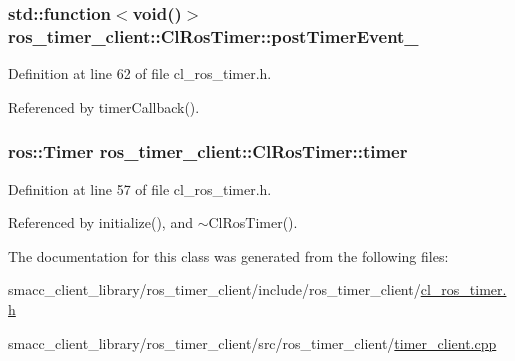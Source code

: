 \subsubsection[{\texorpdfstring{post\+Timer\+Event\+\_\+}{postTimerEvent_}}]{\setlength{\rightskip}{0pt plus 5cm}std\+::function$<$void()$>$ ros\+\_\+timer\+\_\+client\+::\+Cl\+Ros\+Timer\+::post\+Timer\+Event\+\_\+\hspace{0.3cm}{\ttfamily [protected]}}\hypertarget{classros__timer__client_1_1ClRosTimer_a36d871ca009545bf5f43b8b18064e075}{}\label{classros__timer__client_1_1ClRosTimer_a36d871ca009545bf5f43b8b18064e075}


Definition at line 62 of file cl\+\_\+ros\+\_\+timer.\+h.



Referenced by timer\+Callback().

\subsubsection[{\texorpdfstring{timer}{timer}}]{\setlength{\rightskip}{0pt plus 5cm}ros\+::\+Timer ros\+\_\+timer\+\_\+client\+::\+Cl\+Ros\+Timer\+::timer\hspace{0.3cm}{\ttfamily [protected]}}\hypertarget{classros__timer__client_1_1ClRosTimer_a2feedfef1d9db630007af2ca58a7f284}{}\label{classros__timer__client_1_1ClRosTimer_a2feedfef1d9db630007af2ca58a7f284}


Definition at line 57 of file cl\+\_\+ros\+\_\+timer.\+h.



Referenced by initialize(), and $\sim$\+Cl\+Ros\+Timer().



The documentation for this class was generated from the following files\+:\begin{DoxyCompactItemize}
\item 
smacc\+\_\+client\+\_\+library/ros\+\_\+timer\+\_\+client/include/ros\+\_\+timer\+\_\+client/\hyperlink{cl__ros__timer_8h}{cl\+\_\+ros\+\_\+timer.\+h}\item 
smacc\+\_\+client\+\_\+library/ros\+\_\+timer\+\_\+client/src/ros\+\_\+timer\+\_\+client/\hyperlink{timer__client_8cpp}{timer\+\_\+client.\+cpp}\end{DoxyCompactItemize}
